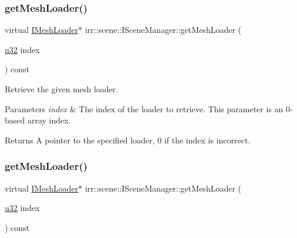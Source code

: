 \subsubsection{\texorpdfstring{get\+Mesh\+Loader()}{getMeshLoader()}\hspace{0.1cm}{\footnotesize\ttfamily [1/2]}}
{\footnotesize\ttfamily virtual \hyperlink{classirr_1_1scene_1_1IMeshLoader}{I\+Mesh\+Loader}$\ast$ irr\+::scene\+::\+I\+Scene\+Manager\+::get\+Mesh\+Loader (\begin{DoxyParamCaption}\item[{\hyperlink{namespaceirr_a0416a53257075833e7002efd0a18e804}{u32}}]{index }\end{DoxyParamCaption}) const\hspace{0.3cm}{\ttfamily [pure virtual]}}



Retrieve the given mesh loader. 


\begin{DoxyParams}{Parameters}
{\em index} & The index of the loader to retrieve. This parameter is an 0-\/based array index. \\
\hline
\end{DoxyParams}
\begin{DoxyReturn}{Returns}
A pointer to the specified loader, 0 if the index is incorrect. 
\end{DoxyReturn}
\mbox{\label{classirr_1_1scene_1_1ISceneManager_afabf244b50875a52eb42d5d375fa40d4}} 
\subsubsection{\texorpdfstring{get\+Mesh\+Loader()}{getMeshLoader()}\hspace{0.1cm}{\footnotesize\ttfamily [2/2]}}
{\footnotesize\ttfamily virtual \hyperlink{classirr_1_1scene_1_1IMeshLoader}{I\+Mesh\+Loader}$\ast$ irr\+::scene\+::\+I\+Scene\+Manager\+::get\+Mesh\+Loader (\begin{DoxyParamCaption}\item[{\hyperlink{namespaceirr_a0416a53257075833e7002efd0a18e804}{u32}}]{index }\end{DoxyParamCaption}) const\hspace{0.3cm}{\ttfamily [pure virtual]}}



